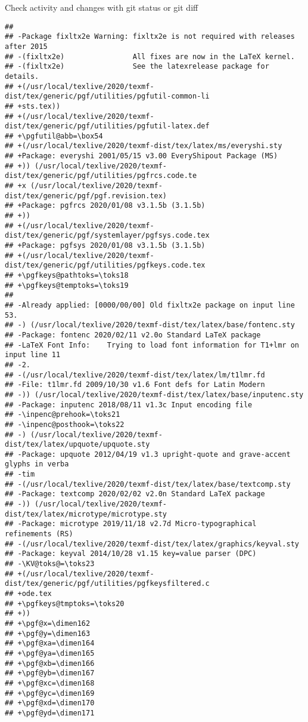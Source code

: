 \documentclass[ignorenonframetext,]{beamer}
\begin{document}
\begin{frame}[fragile]{Check activity and changes with git status or git
diff}
\begin{verbatim}
##  
## -Package fixltx2e Warning: fixltx2e is not required with releases after 2015
## -(fixltx2e)                All fixes are now in the LaTeX kernel.
## -(fixltx2e)                See the latexrelease package for details.
## +(/usr/local/texlive/2020/texmf-dist/tex/generic/pgf/utilities/pgfutil-common-li
## +sts.tex))
## +(/usr/local/texlive/2020/texmf-dist/tex/generic/pgf/utilities/pgfutil-latex.def
## +\pgfutil@abb=\box54
## +(/usr/local/texlive/2020/texmf-dist/tex/latex/ms/everyshi.sty
## +Package: everyshi 2001/05/15 v3.00 EveryShipout Package (MS)
## +)) (/usr/local/texlive/2020/texmf-dist/tex/generic/pgf/utilities/pgfrcs.code.te
## +x (/usr/local/texlive/2020/texmf-dist/tex/generic/pgf/pgf.revision.tex)
## +Package: pgfrcs 2020/01/08 v3.1.5b (3.1.5b)
## +))
## +(/usr/local/texlive/2020/texmf-dist/tex/generic/pgf/systemlayer/pgfsys.code.tex
## +Package: pgfsys 2020/01/08 v3.1.5b (3.1.5b)
## +(/usr/local/texlive/2020/texmf-dist/tex/generic/pgf/utilities/pgfkeys.code.tex
## +\pgfkeys@pathtoks=\toks18
## +\pgfkeys@temptoks=\toks19
##  
## -Already applied: [0000/00/00] Old fixltx2e package on input line 53.
## -) (/usr/local/texlive/2020/texmf-dist/tex/latex/base/fontenc.sty
## -Package: fontenc 2020/02/11 v2.0o Standard LaTeX package
## -LaTeX Font Info:    Trying to load font information for T1+lmr on input line 11
## -2.
## -(/usr/local/texlive/2020/texmf-dist/tex/latex/lm/t1lmr.fd
## -File: t1lmr.fd 2009/10/30 v1.6 Font defs for Latin Modern
## -)) (/usr/local/texlive/2020/texmf-dist/tex/latex/base/inputenc.sty
## -Package: inputenc 2018/08/11 v1.3c Input encoding file
## -\inpenc@prehook=\toks21
## -\inpenc@posthook=\toks22
## -) (/usr/local/texlive/2020/texmf-dist/tex/latex/upquote/upquote.sty
## -Package: upquote 2012/04/19 v1.3 upright-quote and grave-accent glyphs in verba
## -tim
## -(/usr/local/texlive/2020/texmf-dist/tex/latex/base/textcomp.sty
## -Package: textcomp 2020/02/02 v2.0n Standard LaTeX package
## -)) (/usr/local/texlive/2020/texmf-dist/tex/latex/microtype/microtype.sty
## -Package: microtype 2019/11/18 v2.7d Micro-typographical refinements (RS)
## -(/usr/local/texlive/2020/texmf-dist/tex/latex/graphics/keyval.sty
## -Package: keyval 2014/10/28 v1.15 key=value parser (DPC)
## -\KV@toks@=\toks23
## +(/usr/local/texlive/2020/texmf-dist/tex/generic/pgf/utilities/pgfkeysfiltered.c
## +ode.tex
## +\pgfkeys@tmptoks=\toks20
## +))
## +\pgf@x=\dimen162
## +\pgf@y=\dimen163
## +\pgf@xa=\dimen164
## +\pgf@ya=\dimen165
## +\pgf@xb=\dimen166
## +\pgf@yb=\dimen167
## +\pgf@xc=\dimen168
## +\pgf@yc=\dimen169
## +\pgf@xd=\dimen170
## +\pgf@yd=\dimen171

\end{verbatim}
\end{frame}
\end{document}
